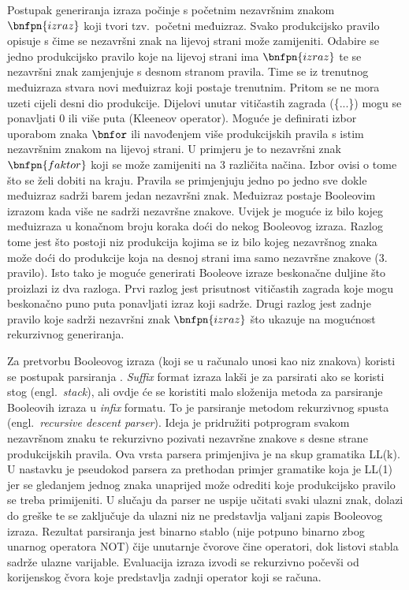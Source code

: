 \documentclass[times, utf8, diplomski]{fer}
\begin{document}
Postupak generiranja izraza počinje s početnim nezavršnim znakom $\bnfpn{izraz}$ koji tvori tzv.~početni međuizraz. Svako produkcijsko pravilo opisuje s čime se nezavršni znak na lijevoj strani može zamijeniti. Odabire se jedno produkcijsko pravilo koje na lijevoj strani ima $\bnfpn{izraz}$ te se nezavršni znak zamjenjuje s desnom stranom pravila. Time se iz trenutnog međuizraza stvara novi međuizraz koji postaje trenutnim. Pritom se ne mora uzeti cijeli desni dio produkcije. Dijelovi unutar vitičastih zagrada (\{...\}) mogu se ponavljati $0$ ili više puta (Kleeneov operator). Moguće je definirati izbor uporabom znaka $\bnfor$ ili navođenjem više produkcijskih pravila s istim nezavršnim znakom na lijevoj strani. U primjeru je to nezavršni znak $\bnfpn{faktor}$ koji se može zamijeniti na $3$ različita načina. Izbor ovisi o tome što se želi dobiti na kraju. Pravila se primjenjuju jedno po jedno sve dokle međuizraz sadrži barem jedan nezavršni znak. Međuizraz postaje Booleovim izrazom kada više ne sadrži nezavršne znakove. Uvijek je moguće iz bilo kojeg međuizraza u konačnom broju koraka doći do nekog Booleovog izraza. Razlog tome jest što postoji niz produkcija kojima se iz bilo kojeg nezavršnog znaka može doći do produkcije koja na desnoj strani ima samo nezavršne znakove ($3.$ pravilo). Isto tako je moguće generirati Booleove izraze beskonačne duljine što proizlazi iz dva razloga. Prvi razlog jest prisutnost vitičastih zagrada koje mogu beskonačno puno puta ponavljati izraz koji sadrže. Drugi razlog jest zadnje pravilo koje sadrži nezavršni znak $\bnfpn{izraz}$ što ukazuje na mogućnost rekurzivnog generiranja.

Za pretvorbu Booleovog izraza (koji se u računalo unosi kao niz znakova) koristi se postupak parsiranja \cite{book:ppj}. \textit{Suffix} format izraza lakši je za parsirati ako se koristi stog (engl.~\textit{stack}), ali ovdje će se koristiti malo složenija metoda za parsiranje Booleovih izraza u \textit{infix} formatu. To je parsiranje metodom rekurzivnog spusta (engl.~\textit{recursive descent parser}). Ideja je pridružiti potprogram svakom nezavršnom znaku te rekurzivno pozivati nezavršne znakove s desne strane produkcijskih pravila. Ova vrsta parsera primjenjiva je na skup gramatika LL(k). U nastavku je pseudokod parsera za prethodan primjer gramatike koja je LL(1) jer se gledanjem jednog znaka unaprijed može odrediti koje produkcijsko pravilo se treba primijeniti. U slučaju da parser ne uspije učitati svaki ulazni znak, dolazi do greške te se zaključuje da ulazni niz ne predstavlja valjani zapis Booleovog izraza. Rezultat parsiranja jest binarno stablo (nije potpuno binarno zbog unarnog operatora NOT) čije unutarnje čvorove čine operatori, dok listovi stabla sadrže ulazne varijable. Evaluacija izraza izvodi se rekurzivno počevši od korijenskog čvora koje predstavlja zadnji operator koji se računa.
\end{document}

